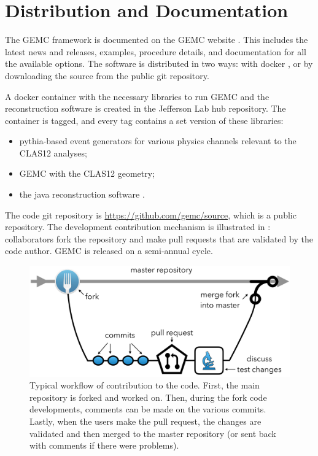 \section{Distribution and Documentation}

The GEMC framework is documented on the GEMC website \cite{GEMC}. This includes the latest news and releases,
examples, procedure details, and documentation for all the available options.
The software is distributed in two ways: with docker \cite{jlabDocker}, or by downloading the source from the public git repository.

A docker container with the necessary libraries to run GEMC and the reconstruction software
is created in the Jefferson Lab hub repository.
The container is tagged, and every tag contains a set version of these libraries:

\begin{itemize}
	\item pythia-based event generators for various physics channels relevant to the CLAS12 analyses;
	\item GEMC with the CLAS12 geometry;
	\item the java reconstruction software \cite{recon-nim}.
\end{itemize}


The code git repository is \url{https://github.com/gemc/source}, which is a public repository.
The development contribution mechanism is illustrated in : collaborators fork the repository
and make pull requests that are validated by the code author.
GEMC is released on a semi-annual cycle.

\begin{figure}
	\centering
	\includegraphics[width=0.99\columnwidth,keepaspectratio]{img/github.png}
	\caption{Typical workflow of contribution to the code. First, the main repository is forked and worked on. Then, during the fork code developments,
	         comments can be made on the various commits. Lastly, when the users make the pull request, the changes are validated and then merged
             to the master repository (or sent back with comments if there were problems).}
	\label{fig:github}
\end{figure}


